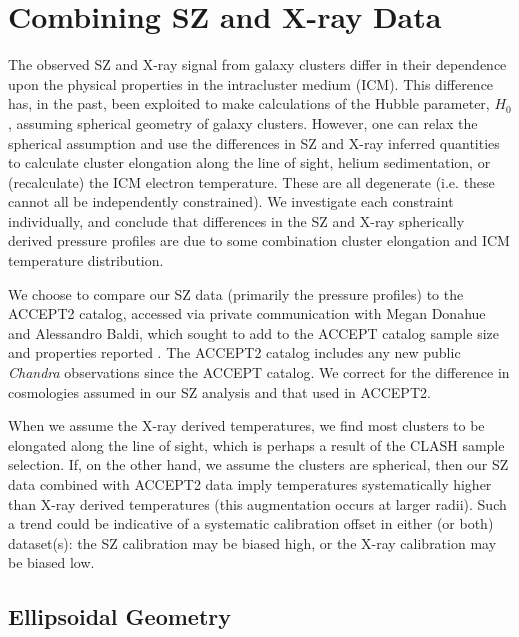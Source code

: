 \documentclass[iop,numberedappendix,apj]{emulateapj}
\begin{document}
\section{Combining SZ and X-ray Data}
\label{sec:xray_comp}

The observed SZ and X-ray signal from galaxy clusters differ in their 
dependence upon the physical properties in the intracluster medium (ICM). This difference
has, in the past, been exploited to make calculations of the Hubble parameter, $H_0$, 
assuming spherical geometry of galaxy clusters. However, one can relax the spherical assumption
and use the differences in SZ and X-ray inferred quantities to calculate cluster elongation
along the line of sight, helium sedimentation, or (recalculate) the ICM electron temperature.
These are all degenerate (i.e. these cannot all be independently constrained). We investigate
each constraint individually, and conclude that differences in the SZ and X-ray spherically derived
pressure profiles are due to some combination cluster elongation and ICM temperature distribution.

We choose to compare our SZ data (primarily the pressure profiles) to the ACCEPT2 catalog, accessed
via private communication with Megan Donahue and Alessandro Baldi, which sought to add to the ACCEPT 
catalog sample size and properties reported \citep{baldi2014}. The ACCEPT2 catalog
includes any new public \emph{Chandra} observations since the ACCEPT catalog. We correct for the
difference in cosmologies assumed in our SZ analysis and that used in ACCEPT2.

When we assume the X-ray derived temperatures, we find most clusters to be elongated along the line of sight,
which is perhaps a result of the CLASH sample selection. If, on the other hand, we assume the clusters are
spherical, then our SZ data combined with ACCEPT2 data imply temperatures systematically higher than
X-ray derived temperatures (this augmentation occurs at larger radii). Such a trend could be indicative of
a systematic calibration offset in either (or both) dataset(s): the SZ calibration may be biased high, 
or the X-ray calibration may be biased low.


\subsection{Ellipsoidal Geometry}
\label{sec:ellgeo}
\end{document}
